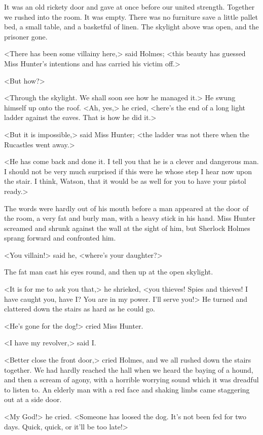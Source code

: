 It was an old rickety door and gave at once before our united strength. Together we rushed into the room. It was empty. There was no furniture save a little pallet bed, a small table, and a basketful of linen. The skylight above was open, and the prisoner gone.

<There has been some villainy here,> said Holmes; <this beauty has guessed Miss Hunter's intentions and has carried his victim off.>

<But how?>

<Through the skylight. We shall soon see how he managed it.> He swung himself up onto the roof. <Ah, yes,> he cried, <here's the end of a long light ladder against the eaves. That is how he did it.>

<But it is impossible,> said Miss Hunter; <the ladder was not there when the Rucastles went away.>

<He has come back and done it. I tell you that he is a clever and dangerous man. I should not be very much surprised if this were he whose step I hear now upon the stair. I think, Watson, that it would be as well for you to have your pistol ready.>

The words were hardly out of his mouth before a man appeared at the door of the room, a very fat and burly man, with a heavy stick in his hand. Miss Hunter screamed and shrunk against the wall at the sight of him, but Sherlock Holmes sprang forward and confronted him.

<You villain!> said he, <where's your daughter?>

The fat man cast his eyes round, and then up at the open skylight.

<It is for me to ask you that,> he shrieked, <you thieves! Spies and thieves! I have caught you, have I\@? You are in my power. I'll serve you!> He turned and clattered down the stairs as hard as he could go.

<He's gone for the dog!> cried Miss Hunter.

<I have my revolver,> said I\@.

<Better close the front door,> cried Holmes, and we all rushed down the stairs together. We had hardly reached the hall when we heard the baying of a hound, and then a scream of agony, with a horrible worrying sound which it was dreadful to listen to. An elderly man with a red face and shaking limbs came staggering out at a side door.

<My God!> he cried. <Someone has loosed the dog. It's not been fed for two days. Quick, quick, or it'll be too late!>

